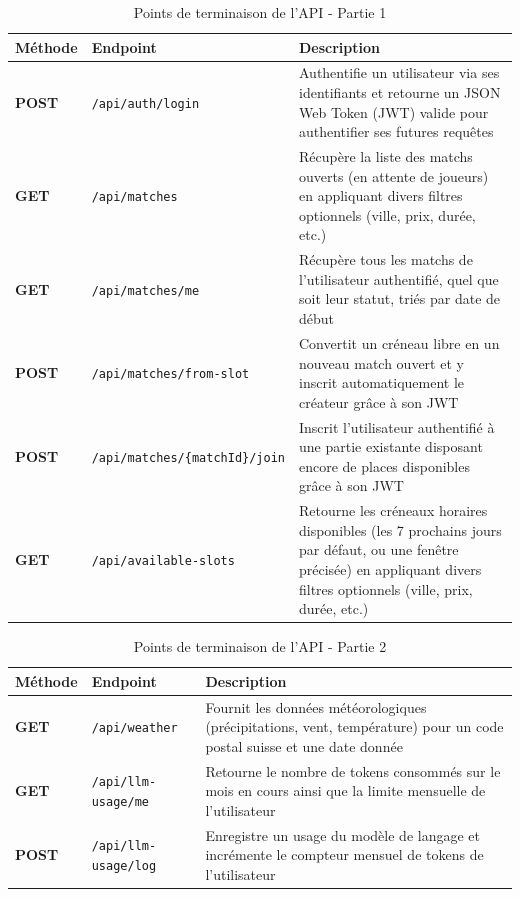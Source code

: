 \documentclass[12pt]{article}
\begin{document}
\vspace{0.5cm}
\begin{table}[H]
    \centering
    \begin{tabularx}{\textwidth}{|l|l|X|}
    \hline
    \rowcolor[gray]{0.9}
    \textbf{Méthode} & \textbf{Endpoint} & \textbf{Description} \\ \hline
    {\textbf{POST}} & \texttt{/api/auth/login} & Authentifie un utilisateur via ses identifiants et retourne un JSON Web Token (JWT) valide pour authentifier ses futures requêtes \\ \hline
    {\textbf{GET}} & \texttt{/api/matches} & Récupère la liste des matchs ouverts (en attente de joueurs) en appliquant divers filtres optionnels (ville, prix, durée, etc.) \\ \hline
    {\textbf{GET}} & \texttt{/api/matches/me} & Récupère tous les matchs de l'utilisateur authentifié, quel que soit leur statut, triés par date de début \\ \hline
    {\textbf{POST}} & \texttt{/api/matches/from-slot} & Convertit un créneau libre en un nouveau match ouvert et y inscrit automatiquement le créateur grâce à son JWT \\ \hline
    {\textbf{POST}} & \texttt{/api/matches/\{matchId\}/join} & Inscrit l'utilisateur authentifié à une partie existante disposant encore de places disponibles grâce à son JWT \\ \hline
    {\textbf{GET}} & \texttt{/api/available-slots} & Retourne les créneaux horaires disponibles (les 7 prochains jours par défaut, ou une fenêtre précisée) en appliquant divers filtres optionnels (ville, prix, durée, etc.) \\ \hline
    \end{tabularx}
    \caption{Points de terminaison de l'API - Partie 1}
    \label{tab:api_endpoints_1}
\end{table}
\vspace{0.2cm}

\vspace{0.3cm}
\begin{table}[H]
    \centering
    \begin{tabularx}{\textwidth}{|l|l|X|}
    \hline
    \rowcolor[gray]{0.9}
    \textbf{Méthode} & \textbf{Endpoint} & \textbf{Description} \\ \hline
    {\textbf{GET}} & \texttt{/api/weather} & Fournit les données météorologiques (précipitations, vent, température) pour un code postal suisse et une date donnée \\ \hline
    {\textbf{GET}} & \texttt{/api/llm-usage/me} & Retourne le nombre de tokens consommés sur le mois en cours ainsi que la limite mensuelle de l'utilisateur \\ \hline
    {\textbf{POST}} & \texttt{/api/llm-usage/log} & Enregistre un usage du modèle de langage et incrémente le compteur mensuel de tokens de l'utilisateur \\ \hline
    \end{tabularx}
    \caption{Points de terminaison de l'API - Partie 2}
    \label{tab:api_endpoints_2}
\end{table}
\vspace{0.2cm}
\end{document}
